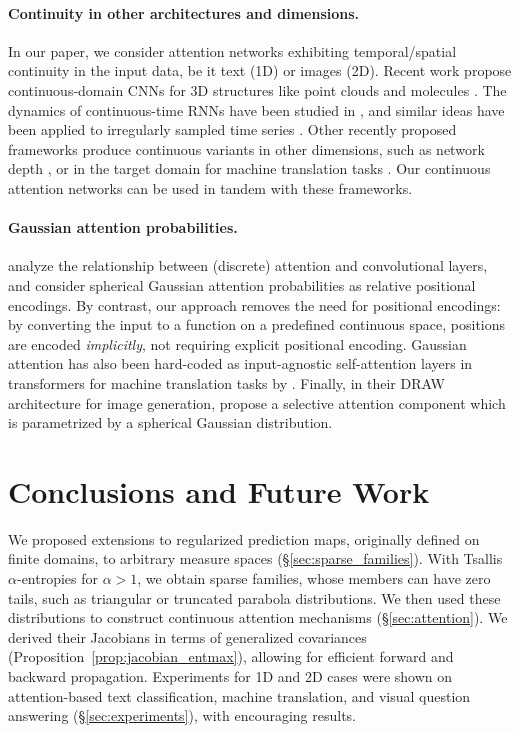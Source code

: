 \documentclass{article}
\newcommand{\remove}[1]{}
\begin{document}
\paragraph{Continuity in other architectures and dimensions.} 
In our paper, we consider attention networks exhibiting temporal/spatial continuity in the input data, be it text (1D) or images (2D). Recent work propose continuous-domain CNNs for 3D structures like point clouds and molecules \citep{wang2018deep,schutt2017schnet}. The dynamics of continuous-time RNNs have been studied in \citep{funahashi1993approximation}, and similar ideas have been applied to irregularly sampled time series \citep{rubanova2019latent}. 
Other recently proposed frameworks produce continuous variants in other dimensions, such as network depth \citep{chen2018neural}, or in the target domain for machine translation tasks \citep{kumar2018mises}.
Our continuous attention networks can be used in tandem with these frameworks.

\paragraph{Gaussian attention probabilities.} 
\citet{cordonnier2020relationship} analyze the relationship between (discrete) attention and convolutional layers, and consider spherical Gaussian attention probabilities as relative positional encodings. By contrast, our approach removes the need for positional encodings: by converting the input to a function on a predefined continuous space, positions are encoded {\it implicitly}, not requiring explicit positional encoding. 
Gaussian attention has also been hard-coded as input-agnostic self-attention layers in transformers for machine translation tasks by 
\citet{you-etal-2020-hard}. 
Finally, in their DRAW architecture for image generation, \citet[\S 3.1]{gregor2015draw} propose a selective attention component which is parametrized by a spherical Gaussian distribution. 


 

\section{Conclusions and Future Work}

We proposed extensions to regularized prediction maps,\remove{and FY losses,} originally defined on finite domains, to arbitrary measure spaces (\S\ref{sec:sparse_families}). 
With Tsallis $\alpha$-entropies for $\alpha>1$, we obtain sparse families, whose members can have zero tails, such as triangular or truncated parabola distributions. 
We then used these distributions to construct continuous attention mechanisms (\S\ref{sec:attention}). We derived their Jacobians in terms of generalized covariances (Proposition~\ref{prop:jacobian_entmax}), allowing for efficient forward and backward propagation.  Experiments for 1D and 2D cases were shown on attention-based text classification, machine translation, and visual question answering (\S\ref{sec:experiments}), with encouraging results. \remove{and FY-based interval regression.}
\end{document}
